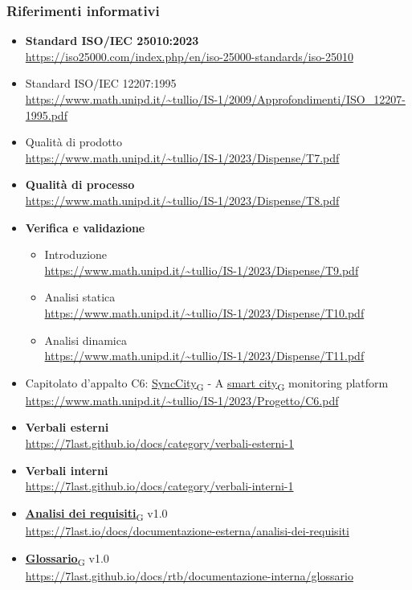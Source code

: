 \subsubsection{Riferimenti informativi}
\begin{itemize}
    \item \textbf{Standard ISO/IEC 25010:2023} \\
        \url{https://iso25000.com/index.php/en/iso-25000-standards/iso-25010}
    \item Standard ISO/IEC 12207:1995 \\
        \url{https://www.math.unipd.it/~tullio/IS-1/2009/Approfondimenti/ISO_12207-1995.pdf}
    \item Qualità di prodotto \\
        \url{https://www.math.unipd.it/~tullio/IS-1/2023/Dispense/T7.pdf}
    \item \textbf{Qualità di processo} \\
        \url{https://www.math.unipd.it/~tullio/IS-1/2023/Dispense/T8.pdf}
    \item \textbf{Verifica e validazione}
        \begin{itemize}
            \item Introduzione \\
                \url{https://www.math.unipd.it/~tullio/IS-1/2023/Dispense/T9.pdf}
            \item Analisi statica \\
                \url{https://www.math.unipd.it/~tullio/IS-1/2023/Dispense/T10.pdf}
            \item Analisi dinamica \\
                \url{https://www.math.unipd.it/~tullio/IS-1/2023/Dispense/T11.pdf}
        \end{itemize}
    \item Capitolato d'appalto C6: \href{https://7last.github.io/docs/rtb/documentazione-interna/glossario\#synccity}{SyncCity\textsubscript{G}} - A \href{https://7last.github.io/docs/rtb/documentazione-interna/glossario\#smart-city}{smart city\textsubscript{G}} monitoring platform \\
        \url{https://www.math.unipd.it/~tullio/IS-1/2023/Progetto/C6.pdf}
    \item \textbf{Verbali esterni} \\
        \url{https://7last.github.io/docs/category/verbali-esterni-1}
    \item \textbf{Verbali interni} \\
        \url{https://7last.github.io/docs/category/verbali-interni-1}
    \item \href{https://7last.github.io/docs/rtb/documentazione-interna/glossario\#analisi-dei-requisiti}{\textbf{Analisi dei requisiti}\textsubscript{G}} v1.0\\
        \url{https://7last.io/docs/documentazione-esterna/analisi-dei-requisiti}
    \item \href{https://7last.github.io/docs/rtb/documentazione-interna/glossario\#glossario}{\textbf{Glossario}\textsubscript{G}} v1.0\\
        \url{https://7last.github.io/docs/rtb/documentazione-interna/glossario}
\end{itemize}